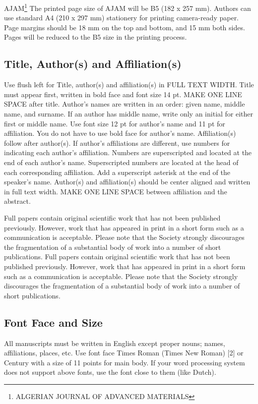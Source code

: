 \documentclass[times,twoside,5p]{ajam}
\begin{document}
AJAM\footnote{ALGERIAN JOURNAL OF ADVANCED MATERIALS}
The printed page size of AJAM will be B5 (182 x 257 mm). Authors can use standard A4 (210 x 297 mm) stationery for printing camera-ready paper. Page margins should be 18 mm on the top and bottom, and 15 mm both sides. Pages will be reduced to the B5 size in the printing process.

\subsection{\bf Title, Author(s) and Affiliation(s)}
Use flush left for Title, author(s) and affiliation(s) in FULL TEXT WIDTH. Title must appear first, written in bold face and font size 14 pt. MAKE ONE LINE SPACE after title. Author's names are written in an order: given name, middle name, and surname. If an author has middle name, write only an initial for either first or middle name. Use font size 12 pt for author's name and 11 pt for affiliation. You do not have to use bold face for author's name. Affiliation(s) follow after author(s). If author’s affiliations are different, use numbers for indicating each author's affiliation. Numbers are superscripted and located at the end of each author's name. Superscripted numbers are located at the head of each corresponding affiliation. Add a superscript asterisk at the end of the speaker’s name. Author(s) and affiliation(s) should be center aligned and written in full text width. MAKE ONE LINE SPACE between affiliation and the abstract.

Full papers contain original scientific work that has not been published previously. However, work that has appeared in print in a short form such as a communication is  acceptable. Please note that the Society strongly discourages the fragmentation of a substantial body of work into a number of short publications. Full papers contain original scientific work that has not been published previously. However, work that has appeared in print in a short form such as a communication is  acceptable. Please note that the Society strongly discourages the fragmentation of a substantial body of work into a number of short publications.

\subsection{Font Face and Size}
\label{S:2}

All manuscripts must be written in English except proper nouns; names, affiliations, places, etc. Use font face Times Roman (Times New Roman) [2] or Century with a size of 11 points for main body. If your word processing system does not support above fonts, use the font close to them (like Dutch).
\end{document}
